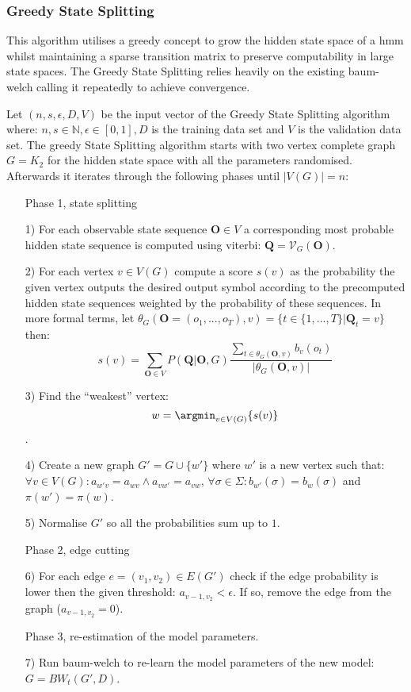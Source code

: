 \subsubsection{Greedy State Splitting}

This algorithm utilises a greedy concept to grow the hidden state space of a \gls{hmm} whilst maintaining a sparse transition matrix to preserve computability in large state spaces. The Greedy State Splitting relies heavily on the existing \gls{baum-welch} calling it repeatedly to achieve convergence.

Let $(n, s, \epsilon, D, V)$ be the input vector of the Greedy State Splitting algorithm where: $n, s \in \mathbb{N}, \epsilon\in[0,1], D$ is the training data set and $V$ is the validation data set. The greedy State Splitting algorithm starts with two vertex complete graph $G=K_2$ for the hidden state space with all the parameters randomised. Afterwards it iterates through the following phases until $|V(G)| = n$:

\begin{itemize}
	\item[] Phase 1, state splitting
	\item[1)] For each observable state sequence $\mathbf{O} \in V$ a corresponding most probable hidden state sequence is computed using \gls{viterbi}: $\mathbf{Q}=\mathcal{V}_G(\mathbf{O})$.
	\item[2)] For each vertex $v \in V(G)$ compute a score $s(v)$ as the probability the given vertex outputs the desired output symbol according to the precomputed hidden state sequences weighted by the probability of these sequences. In more formal terms, let $\theta_G(\mathbf{O}=(o_1,...,o_T), v) = \{t\in\{1, ..., T\}|\mathbf{Q}_t=v\}$ then: $$s(v) = \sum_{\mathbf{O}\in V}P(\mathbf{Q}|\mathbf{O},G) \frac{\sum_{t \in \theta_G(\mathbf{O}, v)}b_v(o_t)}{|\theta_G(\mathbf{O}, v)|}$$
	\item[3)] Find the ``weakest'' vertex: $$w = \argmin_{v\in V(G)}\{s(v)\}$$.
	\item[4)] Create a new graph $G' = G\cup \{w'\}$ where $w'$ is a new vertex such that: $\forall v\in V(G): a_{w'v} = a_{wv} \land a_{vw'} = a_{vw}$, $\forall \sigma \in \Sigma: b_{w'}(\sigma) = b_w(\sigma)$ and $\pi(w') = \pi(w)$.
	\item[5)] Normalise $G'$ so all the probabilities sum up to $1$.
	\item[] Phase 2, edge cutting
	\item[6)] For each edge $e = (v_1,v_2)\in E(G')$ check if the edge probability is lower then the given threshold: $a_{v-1,v_2}<\epsilon$. If so, remove the edge from the graph ($a_{v-1,v_2} = 0$).
	\item[] Phase 3, re-estimation of the model parameters.
	\item[7)] Run \gls{baum-welch} to re-learn the model parameters of the new model: $G = BW_t(G', D)$.
\end{itemize}

